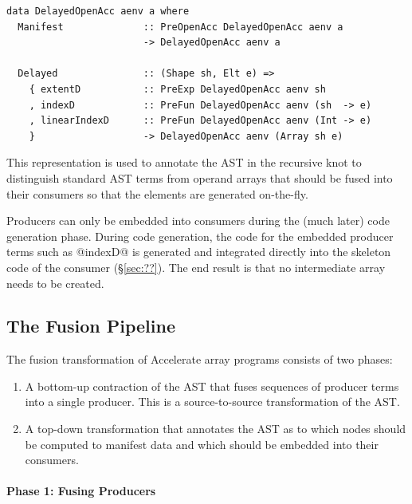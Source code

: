 \begin{lstlisting}[style=haskell_float
    ,name=DelayedOpenAcc
    ,label=lst:DelayedOpenAcc
    ,caption={The type of delayed arrays in Accelerate}]
data DelayedOpenAcc aenv a where
  Manifest              :: PreOpenAcc DelayedOpenAcc aenv a
                        -> DelayedOpenAcc aenv a

  Delayed               :: (Shape sh, Elt e) =>
    { extentD           :: PreExp DelayedOpenAcc aenv sh
    , indexD            :: PreFun DelayedOpenAcc aenv (sh  -> e)
    , linearIndexD      :: PreFun DelayedOpenAcc aenv (Int -> e)
    }                   -> DelayedOpenAcc aenv (Array sh e)
\end{lstlisting}

This representation is used to annotate the AST in
the recursive knot to distinguish standard AST terms from operand arrays that
should be fused into their consumers so that the elements are generated
on-the-fly.

Producers can only be embedded into consumers during the (much later) code
generation phase. During code generation, the code for the embedded producer
terms such as @indexD@ is generated and integrated directly into the
skeleton code of the consumer (\S\ref{sec:??}). The end result is that no
intermediate array needs to be created.


\subsection{The Fusion Pipeline}
\label{sec:fusion_pipeline}

The fusion transformation of Accelerate array programs consists of two phases:
%
\begin{enumerate}
    \item A bottom-up contraction of the AST that fuses sequences of producer
        terms into a single producer. This is a source-to-source transformation
        of the AST\@.

    \item A top-down transformation that annotates the AST as to which nodes
        should be computed to manifest data and which should be embedded into
        their consumers.
\end{enumerate}

\paragraph{Phase 1: Fusing Producers}
\label{sec:fusing_producers}

